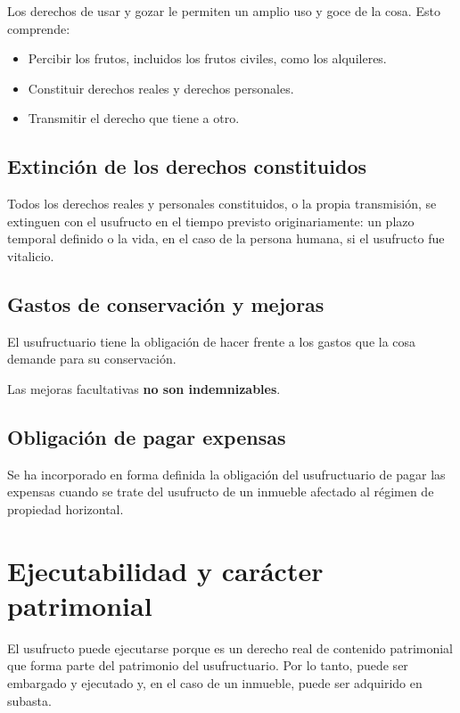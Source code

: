 \documentclass[12pt,oneside]{book}
\begin{document}
Los derechos de usar y gozar le permiten un amplio uso y goce de la cosa. Esto comprende:

\begin{itemize}
    \item Percibir los frutos, incluidos los frutos civiles, como los alquileres.
    \item Constituir derechos reales y derechos personales.
    \item Transmitir el derecho que tiene a otro.
\end{itemize}

\subsection{Extinción de los derechos constituidos}

Todos los derechos reales y personales constituidos, o la propia transmisión, se extinguen con el usufructo en el tiempo previsto originariamente: un plazo temporal definido o la vida, en el caso de la persona humana, si el usufructo fue vitalicio.

\subsection{Gastos de conservación y mejoras}

El usufructuario tiene la obligación de hacer frente a los gastos que la cosa demande para su conservación.

Las mejoras facultativas \textbf{no son indemnizables}.

\subsection{Obligación de pagar expensas}

Se ha incorporado en forma definida la obligación del usufructuario de pagar las expensas cuando se trate del usufructo de un inmueble afectado al régimen de propiedad horizontal.

\section{Ejecutabilidad y carácter patrimonial}

El usufructo puede ejecutarse porque es un derecho real de contenido patrimonial que forma parte del patrimonio del usufructuario. Por lo tanto, puede ser embargado y ejecutado y, en el caso de un inmueble, puede ser adquirido en subasta.
\end{document}
